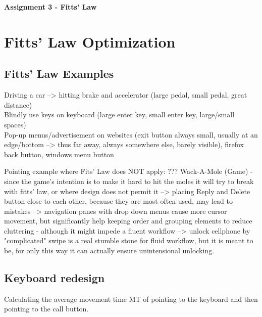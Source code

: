 \documentclass[a4paper,twoside,10pt]{article}
\begin{document}
\pagestyle{fancyplain}


\renewcommand{\headrulewidth}{0px}

\begin{center}
\huge{\textbf{Assignment 3 - Fitts' Law}}
\end{center}
\vspace{.5cm}

\section{Fitts' Law Optimization} 
\subsection{Fitts' Law Examples} 
Driving a car --> hitting brake and accelerator (large pedal, small pedal, great distance)\\
Blindly use keys on keyboard (large enter key, small enter key, large/small spaces)\\
Pop-up menus/advertisement on websites (exit button always small, usually at an edge/bottom --> thus far away, always somewhere else, barely visible), firefox back button, windows menu button

Pointing example where Fits' Law does NOT apply: ??? Wack-A-Mole (Game) - since the game's intention is to make it hard to hit the moles it will try to break with fitts' law, or where design does not permit it --> placing Reply and Delete button close to each other, because they are most often used, may lead to mistakes --> navigation panes with drop down menus cause more cursor movement, but significantly help keeping order and grouping elements to reduce cluttering - although it might impede a fluent workflow --> unlock cellphone by "complicated" swipe is a real stumble stone for fluid workflow, but it is meant to be, for only this way it can actually ensure unintensional unlocking.

\subsection{Keyboard redesign} 
Calculating the average movement time MT of pointing to the keyboard and then pointing to the call button.
\end{document}
